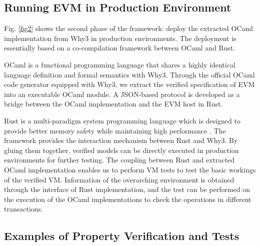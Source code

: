 \documentclass[runningheads]{llncs}
\begin{document}
\subsection{Running EVM in Production Environment}
Fig. \ref{fig2} shows the second phase of the framework: deploy the extracted OCaml implementation from Why3 in production environments. 
The deployment is essentially based on a co-compilation framework between OCaml and Rust.

OCaml is a functional programming language that shares a highly identical language definition and formal semantics with Why3. 
Through the official OCaml code generator equipped with Why3, 
we extract the verified specification of EVM into an executable OCaml module. 
A JSON-based protocol is developed as a bridge between the OCaml implementation and the EVM host in Rust.


Rust is a multi-paradigm system programming language which is designed to provide better memory safety 
while maintaining high performance \cite{LBHN16}.
The framework provides the interaction mechanism between Rust and Why3. 
By gluing them together, verified models can be directly executed in production environments for further testing. 
The coupling between Rust and extracted OCaml implementation enables us to perform VM tests to test the basic workings of the verified VM. 
Information of the overarching environment is obtained through the interface of Rust implementation, 
and the test can be performed on the execution of the OCaml implementations to check the operations in different transactions.    

\subsection{Examples of Property Verification and Tests}
\end{document}
